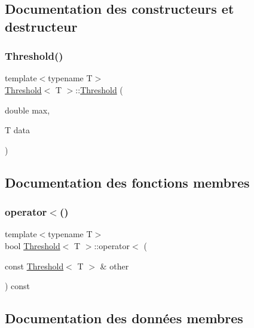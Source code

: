 \subsection{Documentation des constructeurs et destructeur}
\mbox{\label{struct_threshold_acff40589799e19c56704bf23fa25cdf5}} 
\subsubsection{\texorpdfstring{Threshold()}{Threshold()}}
{\footnotesize\ttfamily template$<$typename T$>$ \\
\hyperlink{struct_threshold}{Threshold}$<$ T $>$\+::\hyperlink{struct_threshold}{Threshold} (\begin{DoxyParamCaption}\item[{double}]{max,  }\item[{T}]{data }\end{DoxyParamCaption})\hspace{0.3cm}{\ttfamily [inline]}}



\subsection{Documentation des fonctions membres}
\mbox{\label{struct_threshold_a40250fbaa1d32ec4992aa7bc32480f00}} 
\subsubsection{\texorpdfstring{operator$<$()}{operator<()}}
{\footnotesize\ttfamily template$<$typename T$>$ \\
bool \hyperlink{struct_threshold}{Threshold}$<$ T $>$\+::operator$<$ (\begin{DoxyParamCaption}\item[{const \hyperlink{struct_threshold}{Threshold}$<$ T $>$ \&}]{other }\end{DoxyParamCaption}) const\hspace{0.3cm}{\ttfamily [inline]}}



\subsection{Documentation des données membres}
\mbox{\label{struct_threshold_ac2020d28bcb091ebfa9a6e967cc652a3}} 
